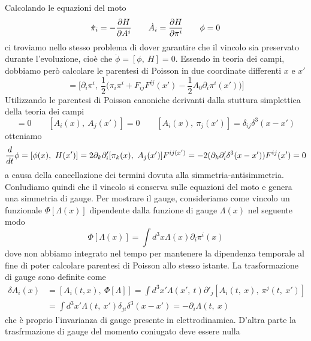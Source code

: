     Calcolando le equazioni del moto 
\begin{equation*}
    \dot \pi_i = - \frac{\partial H}{\partial A^i} \qquad \dot A_i = \frac{\partial H}{\partial\pi^i} \qquad \phi = 0
\end{equation*}
    ci troviamo nello stesso problema di dover garantire che il vincolo sia preservato durante l'evoluzione, cioè che $\dot \phi = [\phi, ~H] = 0$. Essendo in teoria dei campi, dobbiamo però calcolare le parentesi di Poisson in due coordinate differenti $x$ e $x'$
\begin{equation*}
    [\phi(x), ~ H(x')] = \Big[\partial_i \pi^i, ~ \frac{1}{2} \Big( \pi_i \pi^i + F_{ij} F^{ij}(x') - \frac{1}{2} A_0 \partial_i \pi^i(x') \Big) \Big]
\end{equation*}
    Utilizzando le parentesi di Poisson canoniche derivanti dalla stuttura simplettica della teoria dei campi
\begin{equation*}
    [\pi_i(x), ~\pi_j(x')] = 0 \qquad [A_i(x), ~A_j(x')] = 0 \qquad [A_i(x), ~\pi_j(x')] = \delta_{ij} \delta^3(x - x')
\end{equation*}
    otteniamo 
\begin{equation*}
    \frac{d}{dt} \phi = [\phi(x), ~H(x')] = 2 \partial_k \partial'_i [\pi_k(x), ~A_j(x')] F^{ij(x')} = -2(\partial_k \partial'_i \delta^3(x - x')) F^{ij} (x') = 0
\end{equation*}
    a causa della cancellazione dei termini dovuta alla simmetria-antisimmetria. Conludiamo quindi che il vincolo si conserva sulle equazioni del moto e genera una simmetria di gauge. Per mostrare il gauge, consideriamo come vincolo un funzionale $\Phi[\Lambda(x)]$ dipendente dalla funzione di gauge $\Lambda(x)$ nel seguente modo 
\begin{equation*}
    \Phi[\Lambda(x)] = \int d^3 x \Lambda(x) \partial_i \pi^i(x)
\end{equation*}
    dove non abbiamo integrato nel tempo per mantenere la dipendenza temporale al fine di poter calcolare parentesi di Poisson allo stesso istante. La trasformazione di gauge sono definite come 
\begin{equation*}
\begin{aligned}
    \delta A_i (x) & = [A_i(t, x), ~\Phi[\Lambda]] = \int d^3 x' \Lambda(x', ~t) \partial'_j [A_i(t, ~x), ~ \pi^j(t, ~x')] \\ & = \int d^3 x' \Lambda(t, ~x') \delta_{ji} \delta^3 (x-x') = - \partial_i \Lambda(t, ~x)
\end{aligned}
\end{equation*}
    che è proprio l'invarianza di gauge presente in elettrodinamica. D'altra parte la trasfrmazione di gauge del momento coniugato deve essere nulla 
